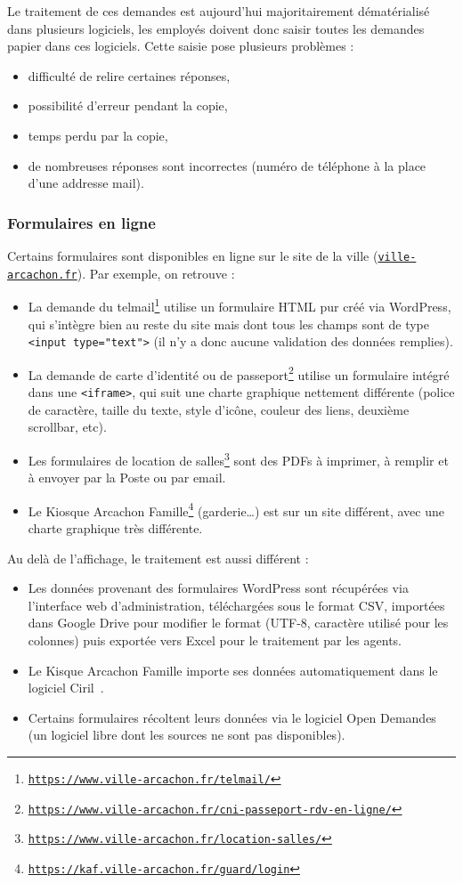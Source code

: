 \documentclass[11pt,french]{memoir}
\newcommand{\hrefs}[1]{\href{#1}{\texttt{#1}}}
\begin{document}
	Le traitement de ces demandes est aujourd'hui majoritairement dématérialisé dans plusieurs logiciels,
	les employés doivent donc saisir toutes les demandes papier dans ces logiciels.
	Cette saisie pose plusieurs problèmes :
	\begin{itemize}
		\item difficulté de relire certaines réponses,
		\item possibilité d'erreur pendant la copie,
		\item temps perdu par la copie,
		\item de nombreuses réponses sont incorrectes (numéro de téléphone à la place d'une addresse mail).
	\end{itemize}

	\subsubsection{Formulaires en ligne}
	\lstset{language=html}

	Certains formulaires sont disponibles en ligne sur le site de la ville (\hrefs{ville-arcachon.fr}).
	Par exemple, on retrouve :
	\begin{itemize}
		\item La demande du telmail\footnote{\hrefs{https://www.ville-arcachon.fr/telmail/}} utilise un formulaire HTML pur créé via WordPress, qui s'intègre bien au reste du site mais dont tous les champs sont de type \lstinline{<input type="text">} (il n'y a donc aucune validation des données remplies).
		\item La demande de carte d'identité ou de passeport\footnote{\hrefs{https://www.ville-arcachon.fr/cni-passeport-rdv-en-ligne/}} utilise un formulaire intégré dans une \lstinline{<iframe>}, qui suit une charte graphique nettement différente (police de caractère, taille du texte, style d'icône, couleur des liens, deuxième scrollbar, etc).
		\item Les formulaires de location de salles\footnote{\hrefs{https://www.ville-arcachon.fr/location-salles/}} sont des PDFs à imprimer, à remplir et à envoyer par la Poste ou par email.
		\item Le Kiosque Arcachon Famille\footnote{\hrefs{https://kaf.ville-arcachon.fr/guard/login}} (garderie…) est sur un site différent, avec une charte graphique très différente.
	\end{itemize}

	Au delà de l'affichage, le traitement est aussi différent :
	\begin{itemize}
		\item Les données provenant des formulaires WordPress sont récupérées via l'interface web d'administration, téléchargées sous le format CSV, importées dans Google Drive pour modifier le format (UTF-8, caractère utilisé pour les colonnes) puis exportée vers Excel pour le traitement par les agents.
		\item Le Kisque Arcachon Famille importe ses données automatiquement dans le logiciel Ciril~\cite{ciril}.
		\item Certains formulaires récoltent leurs données via le logiciel Open Demandes~\cite{opendemandes} (un logiciel libre dont les sources ne sont pas disponibles).
	\end{itemize}
\end{document}

